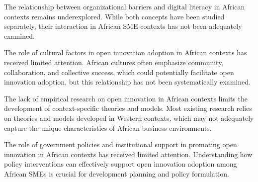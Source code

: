 \documentclass[12pt,a4paper]{article}
\begin{document}
The relationship between organizational barriers and digital literacy in African contexts remains underexplored. While both concepts have been studied separately, their interaction in African SME contexts has not been adequately examined.

The role of cultural factors in open innovation adoption in African contexts has received limited attention. African cultures often emphasize community, collaboration, and collective success, which could potentially facilitate open innovation adoption, but this relationship has not been systematically examined.

The lack of empirical research on open innovation in African contexts limits the development of context-specific theories and models. Most existing research relies on theories and models developed in Western contexts, which may not adequately capture the unique characteristics of African business environments.

The role of government policies and institutional support in promoting open innovation in African contexts has received limited attention. Understanding how policy interventions can effectively support open innovation adoption among African SMEs is crucial for development planning and policy formulation.
\end{document}
